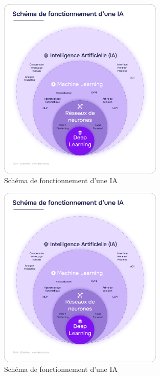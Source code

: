\documentclass[11pt,a4paper]{report}
\begin{document}
\begin{figure}[h]
    \centering
    \includegraphics[width=0.7\textwidth]{images/2.1.1_2.png}
    \caption{Schéma de fonctionnement d'une IA}
    \label{fig:2.1.1_2}
\end{figure}

\begin{figure}[h]
    \centering
    \includegraphics[width=0.7\textwidth]{images/2.1.1_2.png}
    \caption{Schéma de fonctionnement d'une IA}
    \label{fig:2.1.1_2}
\end{figure}
\end{document}
